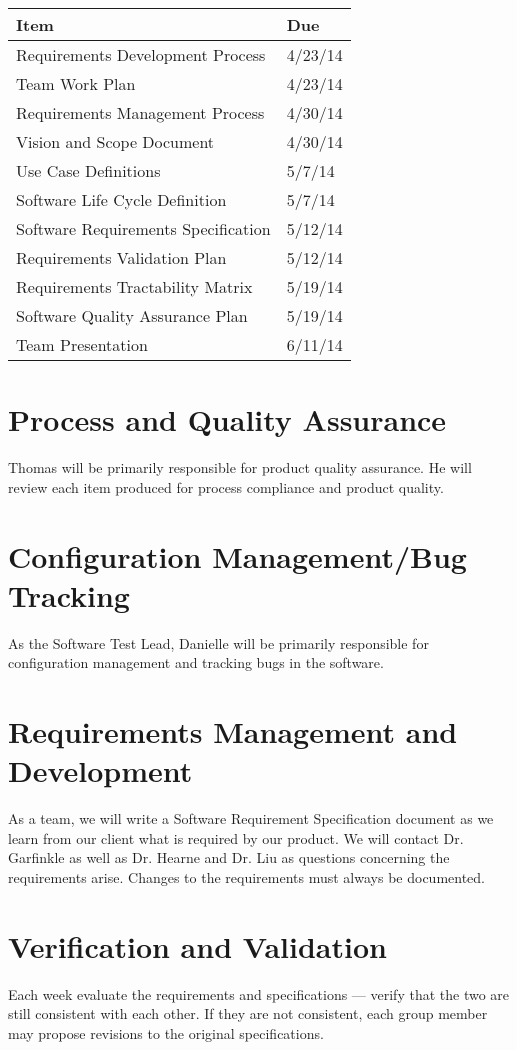 \documentclass[11pt]{article}
\begin{document}
\begin{tabularx}{\textwidth}{|X|l|}
	\hline
	\textbf{Item} & \textbf{Due}\\
	\hline
	Requirements Development Process & 4/23/14\\ \hline
	Team Work Plan & 4/23/14\\ \hline
	Requirements Management Process & 4/30/14\\ \hline
	Vision and Scope Document & 4/30/14\\ \hline
	Use Case Definitions & 5/7/14\\ \hline
	Software Life Cycle Definition & 5/7/14\\ \hline
	Software Requirements Specification & 5/12/14\\ \hline
	Requirements Validation Plan & 5/12/14\\ \hline
	Requirements Tractability Matrix & 5/19/14\\ \hline
	Software Quality Assurance Plan & 5/19/14\\ \hline
	Team Presentation & 6/11/14\\ \hline
\end{tabularx}

\section{Process and Quality Assurance}
Thomas will be primarily responsible for product quality assurance. He will review each item produced for process compliance and product quality.

\section{Configuration Management/Bug Tracking}
As the Software Test Lead, Danielle will be primarily responsible for configuration management and tracking bugs in the software.

\section{Requirements Management and Development}
As a team, we will write a Software Requirement Specification document as we learn from our client what is required by our product. We will contact Dr. Garfinkle as well as Dr. Hearne and Dr. Liu as questions concerning the requirements arise. Changes to the requirements must always be documented.

\section{Verification and Validation}
Each week evaluate the requirements and specifications --- verify that the two are still consistent with each other. If they are not consistent, each group member may propose revisions to the original specifications.
\end{document}

